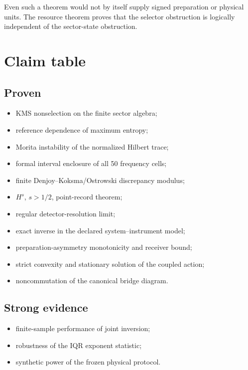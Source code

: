 \documentclass[11pt,a4paper,openany]{report}
\begin{document}
Even such a theorem would not by itself supply signed preparation or physical units. The resource theorem proves that the selector obstruction is logically independent of the sector-state obstruction.

\section{Claim table}

\subsection{Proven}

\begin{itemize}
\item 
KMS nonselection on the finite sector algebra;

\item 
reference dependence of maximum entropy;

\item 
Morita instability of the normalized Hilbert trace;

\item 
formal interval enclosure of all 50 frequency cells;

\item 
finite Denjoy--Koksma/\allowbreak{}Ostrowski discrepancy modulus;

\item 
\(H^s\), \(s>1/2\), point-record theorem;

\item 
regular detector-resolution limit;

\item 
exact inverse in the declared system--instrument model;

\item 
preparation-asymmetry monotonicity and receiver bound;

\item 
strict convexity and stationary solution of the coupled action;

\item 
noncommutation of the canonical bridge diagram.

\end{itemize}

\subsection{Strong evidence}

\begin{itemize}
\item 
finite-sample performance of joint inversion;

\item 
robustness of the IQR exponent statistic;

\item 
synthetic power of the frozen physical protocol.

\end{itemize}
\end{document}
